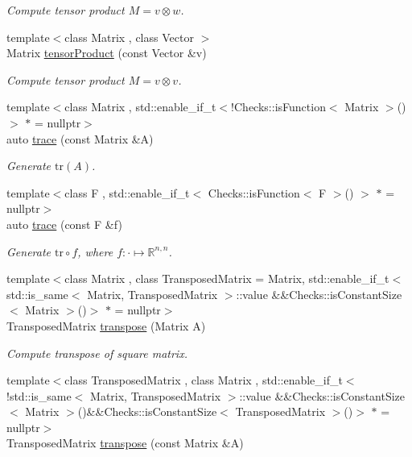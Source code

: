 \begin{DoxyCompactItemize}
\begin{DoxyCompactList}\small\item\em Compute tensor product $ M = v \otimes w $. \end{DoxyCompactList}\item 
{\footnotesize template$<$class Matrix , class Vector $>$ }\\Matrix \hyperlink{group__LinearAlgebraGroup_gae5e82b9e66319511dae5ff0d9304a6b7}{tensor\+Product} (const Vector \&v)
\begin{DoxyCompactList}\small\item\em Compute tensor product $ M = v \otimes v $. \end{DoxyCompactList}\item 
{\footnotesize template$<$class Matrix , std\+::enable\+\_\+if\+\_\+t$<$!\+Checks\+::is\+Function$<$ Matrix $>$()$>$ $\ast$  = nullptr$>$ }\\auto \hyperlink{group__LinearAlgebraGroup_ga4d73eb4d46dd9196a31e2d6d557d509e}{trace} (const Matrix \&A)
\begin{DoxyCompactList}\small\item\em Generate $\mathrm{tr}(A)$. \end{DoxyCompactList}\item 
{\footnotesize template$<$class F , std\+::enable\+\_\+if\+\_\+t$<$ Checks\+::is\+Function$<$ F $>$() $>$ $\ast$  = nullptr$>$ }\\auto \hyperlink{group__LinearAlgebraGroup_ga950717870525c43be79245413717673c}{trace} (const F \&f)
\begin{DoxyCompactList}\small\item\em Generate $\mathrm{tr}\circ f$, where $f:\cdot\mapsto\mathbb{R}^{n,n} $. \end{DoxyCompactList}\item 
{\footnotesize template$<$class Matrix , class Transposed\+Matrix  = Matrix, std\+::enable\+\_\+if\+\_\+t$<$ std\+::is\+\_\+same$<$ Matrix, Transposed\+Matrix $>$\+::value \&\&\+Checks\+::is\+Constant\+Size$<$ Matrix $>$()$>$ $\ast$  = nullptr$>$ }\\Transposed\+Matrix \hyperlink{group__LinearAlgebraGroup_gaf299ac9490ae23da0a3a3d784e379d1f}{transpose} (Matrix A)
\begin{DoxyCompactList}\small\item\em Compute transpose of square matrix. \end{DoxyCompactList}\item 
{\footnotesize template$<$class Transposed\+Matrix , class Matrix , std\+::enable\+\_\+if\+\_\+t$<$!std\+::is\+\_\+same$<$ Matrix, Transposed\+Matrix $>$\+::value \&\&\+Checks\+::is\+Constant\+Size$<$ Matrix $>$()\&\&\+Checks\+::is\+Constant\+Size$<$ Transposed\+Matrix $>$()$>$ $\ast$  = nullptr$>$ }\\Transposed\+Matrix \hyperlink{group__LinearAlgebraGroup_gaffe414459cb85a455a3c5a2099cfc6ee}{transpose} (const Matrix \&A)

\end{DoxyCompactItemize}
